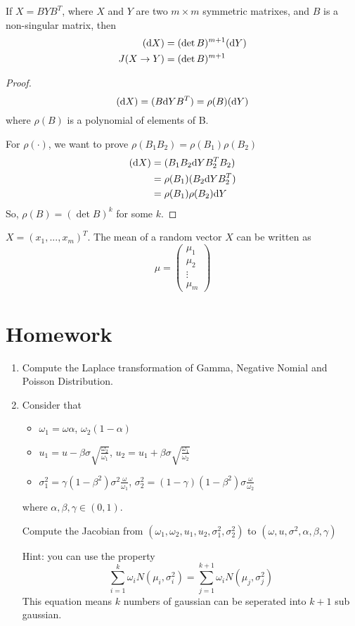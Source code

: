 	\begin{theorem}
		If $X = BYB^T$, where $X$ and $Y$ are two $m\times m$ symmetric matrixes, and $B$ is a non-singular matrix, then
		\begin{align*}
			(\mathrm{d} X) &= (\det B)^{m+1} (\mathrm{d} Y)\\
			J(X\to Y) &= (\det B)^{m+1}
		\end{align*}
	\end{theorem}
	\begin{proof}
		$$(\mathrm{d} X) = (B\mathrm{d} Y B^T) = \rho(B)(\mathrm{d} Y)$$
		where $\rho(B)$ is a polynomial of elements of B.
		
		For $\rho(\cdot)$, we want to prove $\rho(B_1B_2) = \rho(B_1)\rho(B_2)$
		\begin{align*}
			(\mathrm{d} X) & = (B_1B_2\mathrm{d} YB_2^TB_2) \\
			&= \rho(B_1)(B_2\mathrm{d} YB_2^T)\\
			& = \rho(B_1)\rho(B_2)\mathrm{d} Y
		\end{align*}
	So, $\rho(B) = (\det B)^k$ for some $k$.
	\end{proof}
	
	\begin{definition}
		$X = (x_1, ..., x_m)^T$. The mean of a random vector $X$ can be written as 
		$$\mu = \left(
		\begin{array}{c}
			\mu_1\\
			\mu_2\\
			\vdots\\
			\mu_m
		\end{array}
		\right)$$
	\end{definition}




\section{Homework}
	\begin{enumerate}
		\item Compute the Laplace transformation of Gamma, Negative Nomial and Poisson Distribution.
		
		\item Consider that 
		\begin{itemize}
			\item $\omega_1 = \omega \alpha$, $\omega_2(1-\alpha)$
			\item $u_1 = u-\beta \sigma \sqrt{\frac{\omega_2}{\omega_1}}$, $u_2 = u_1+\beta \sigma \sqrt{\frac{\omega_1}{\omega_2}}$
			\item $\sigma_1^2 = \gamma(1-\beta^2)\sigma^2\frac{\omega}{\omega_1}$, $\sigma^2_2 = (1-\gamma)(1-\beta^2)\sigma\frac{\omega}{\omega_2}$
		\end{itemize}
	where $\alpha, \beta, \gamma \in (0, 1)$.
	
	Compute the Jacobian from $(\omega_1, \omega_2, u_1, u_2, \sigma_1^2, \sigma_2^2)$ to $(\omega, u, \sigma^2, \alpha, \beta, \gamma)$
	
	Hint: you can use the property $$\sum_{i = 1}^{k} \omega_i  N(\mu_i, \sigma_i^2) = \sum_{j=1}^{k+1}\omega_i N(\mu_j, \sigma_j^2)$$
	This equation means $k$ numbers of gaussian can be seperated into $k+1$ sub gaussian.
	\end{enumerate}